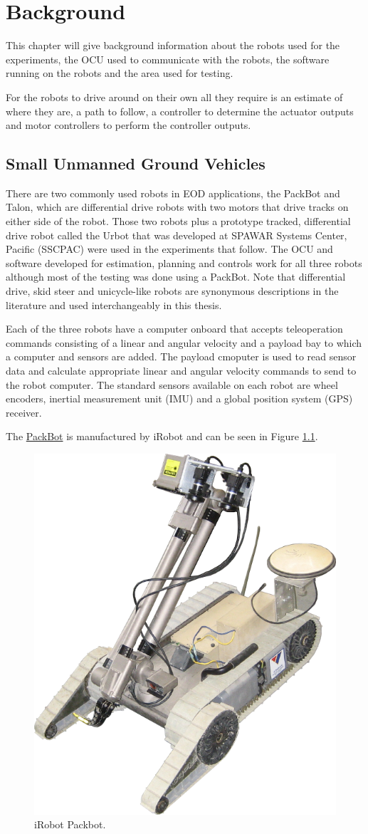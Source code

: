 \chapter{Background}
\label{ch:background}
This chapter will give background information about the robots used for the experiments, the OCU used to communicate with the robots, the software running on the robots and the area used for testing.

For the robots to drive around on their own all they require is an estimate of where they are, a path to follow, a controller to determine the actuator outputs and motor controllers to perform the controller outputs.

\section{Small Unmanned Ground Vehicles}
\label{sec:smallugvs}
There are two commonly used robots in EOD applications, the PackBot and Talon, which are differential drive robots with two motors that drive tracks on either side of the robot. Those two robots plus a prototype tracked, differential drive robot called the Urbot that was developed at SPAWAR Systems Center, Pacific (SSCPAC) were used in the experiments that follow. The OCU and software developed for estimation, planning and controls work for all three robots although most of the testing was done using a PackBot. Note that differential drive, skid steer and unicycle-like robots are synonymous descriptions in the literature and used interchangeably in this thesis.

Each of the three robots have a computer onboard that accepts teleoperation commands consisting of a linear and angular velocity and a payload bay to which a computer and sensors are added. The payload cmoputer is used to read sensor data and calculate appropriate linear and angular velocity commands to send to the robot computer. The standard sensors available on each robot are wheel encoders, inertial measurement unit (IMU) and a global position system (GPS) receiver.

The \href{http://www.irobot.com/sp.cfm?pageid=171}{PackBot} is manufactured by iRobot and can be seen in Figure \ref{fig:packbot}.

\begin{figure}[ht!]
	\centering
	\includegraphics[width=.3\textwidth]{images/packbot}
	\caption{iRobot Packbot.}
	\label{fig:packbot}
\end{figure}

